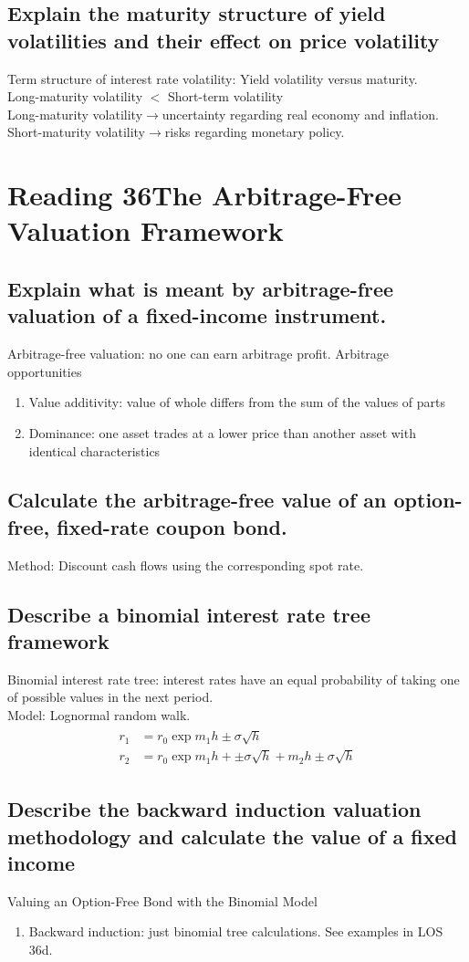\documentclass{article}
\newcommand{\be}{\begin{enumerate}}
\newcommand{\ee}{\end{enumerate}}
\newcommand{\ra}{$\rightarrow$}
\newcommand{\eq}[1]{\begin{align*}\begin{split}#1\end{split}\end{align*}}
\begin{document}
\subsection{Explain the maturity structure of yield volatilities and their effect on price
volatility}
Term structure of interest rate volatility: Yield volatility versus maturity.
\\Long-maturity volatility $<$ Short-term volatility
\\Long-maturity volatility\ra uncertainty regarding real economy and inflation. 
\\Short-maturity volatility\ra risks regarding monetary policy.

\section{Reading 36The Arbitrage-Free Valuation Framework}
\subsection{Explain what is meant by arbitrage-free valuation of a fixed-income instrument.}
Arbitrage-free valuation: no one can earn arbitrage profit.
Arbitrage opportunities
\be
    \item Value additivity: value of whole differs from the sum of the values of parts
    \item Dominance: one asset trades at a lower price than another asset with identical characteristics
\ee
\subsection{Calculate the arbitrage-free value of an option-free, fixed-rate coupon bond.}
Method: Discount cash flows using the corresponding spot rate.
\subsection{Describe a binomial interest rate tree framework}
Binomial interest rate tree: interest rates have an equal probability of taking one of
possible values in the next period.
\\ Model: Lognormal random walk.
\eq{
    r_1& = r_0 \exp{m_1 h\pm\sigma\sqrt{h}}\\
    r_2& = r_0 \exp{m_1 h+\pm\sigma\sqrt{h}+m_2 h\pm\sigma\sqrt{h}}
}
\subsection{Describe the backward induction valuation methodology and calculate the value of a 
fixed income}
Valuing an Option-Free Bond with the Binomial Model
\be
    \item Backward induction: just binomial tree calculations. See examples in LOS 36d.
\ee
\end{document}
